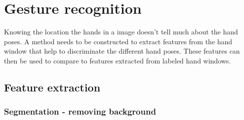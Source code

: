 
\chapter{Gesture recognition}
\label{ch:gestures}

Knowing the location the hands in a image doesn't tell much about the hand poses. A method needs to be constructed to extract features from the hand window that help to discriminate the different hand poses. These features can then be used to compare to features extracted from labeled hand windows.

\section{Feature extraction}

\subsection*{Segmentation - removing background}

\begin{figure}[htbp]
\begin{center}
\hspace{0.03\linewidth}
\hspace{0.03\linewidth}
\end{center}
\end{figure}

